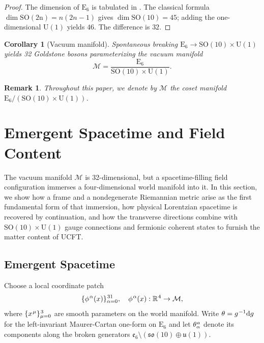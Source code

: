 \documentclass[pdflatex,sn-mathphys-num]{sn-jnl}
\theoremstyle{thmstyleone}
\newtheorem{corollary}[corollary]{Corollary}
\theoremstyle{thmstyletwo}%
\newtheorem{remark}{Remark}%
\theoremstyle{thmstylethree}%
\newcommand{\SO}[1]{\mathrm{SO(#1)}}
\newcommand{\U}[1]{\mathrm{U(#1)}}
\newcommand{\E}[1]{\mathrm{E_{#1}}}
\newcommand{\M}{\mathcal{M}}
\newcommand{\SOTen}{\SO{10}}
\newcommand{\UOne}{\U{1}}
\newcommand{\ESix}{\E{6}}
\newcommand{\SOTenXUOne}{\SOTen \times \UOne}
\newcommand{\MCoset}{\frac{\ESix}{\SOTenXUOne}}
\newcommand{\sm}{\hspace{.065em}}
\newcommand{\smexp}[1]{^{\sm #1}}
\begin{document}
\begin{proof}
The dimension of $\ESix$ is tabulated in \cite{Slansky:1981}.  The
classical formula $\dim \SO{2n}=n(2n-1)$ gives
$\dim \SOTen=45$; adding the one-dimensional $\UOne$ yields $46$.  The
difference is $32$.
\end{proof}

\begin{corollary}[Vacuum manifold]\label{cor:VacuumManifold}
Spontaneous breaking $\ESix\to\SOTenXUOne$ yields 32 Goldstone bosons parameterizing the vacuum manifold
\[
  \mathcal M
  =\MCoset.
\]
\end{corollary}

\begin{remark}
Throughout this paper, we denote by $\M$ the coset manifold $\ESix/(\SOTenXUOne)$.
\end{remark}

\section{Emergent Spacetime and Field Content}
\label{sec:EmergentFields}
The vacuum manifold $\M$ is 32-dimensional, but a spacetime-filling field
configuration immerses a four-dimensional world manifold into it. In this
section, we show how a frame and a nondegenerate Riemannian metric arise as the
first fundamental form of that immersion, how physical Lorentzian spacetime is
recovered by continuation, and how the transverse directions combine with
$\SOTenXUOne$ gauge connections and fermionic coherent states to furnish the
matter content of UCFT.

\subsection{Emergent Spacetime}
\label{subsec:EmergentSpacetime}
Choose a local coordinate patch
$$
  \{\phi\smexp{\alpha} (x)\}_{\alpha=0}\smexp{31},\quad
  \phi\smexp{\alpha}(x):\mathbb R\smexp{4}\to\mathcal M,
$$
where $\{x\smexp{\mu}\}_{\mu=0}\smexp3$ are smooth parameters on the world
manifold.  Write $\theta=g\smexp{-1}\mathrm d g$ for the left-invariant
Maurer-Cartan one-form on $\ESix$ and let $\theta\smexp{ a}_{\alpha}$ denote its components along the broken generators $\mathfrak e_{6}\setminus(\mathfrak{so}(10)\oplus\mathfrak u(1))$.
\end{document}
